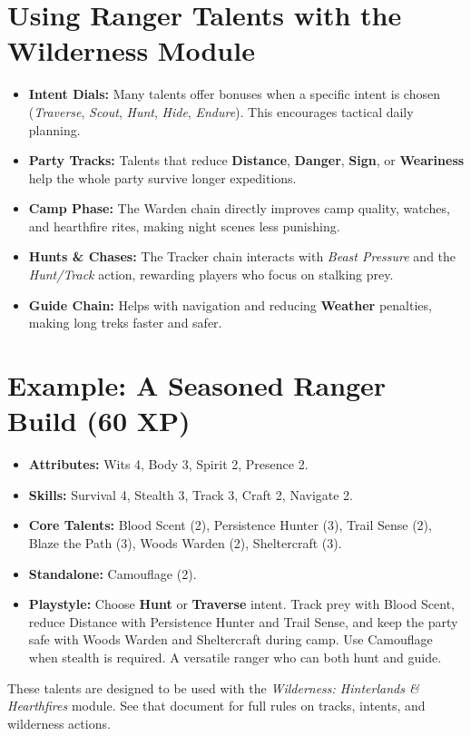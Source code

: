 \documentclass[11pt]{article}
\begin{document}
\section{Using Ranger Talents with the Wilderness Module}

\begin{itemize}
  \item \textbf{Intent Dials:} Many talents offer bonuses when a specific intent is chosen (\emph{Traverse}, \emph{Scout}, \emph{Hunt}, \emph{Hide}, \emph{Endure}). This encourages tactical daily planning.
  \item \textbf{Party Tracks:} Talents that reduce \textbf{Distance}, \textbf{Danger}, \textbf{Sign}, or \textbf{Weariness} help the whole party survive longer expeditions.
  \item \textbf{Camp Phase:} The Warden chain directly improves camp quality, watches, and hearthfire rites, making night scenes less punishing.
  \item \textbf{Hunts \& Chases:} The Tracker chain interacts with \emph{Beast Pressure} and the \emph{Hunt/Track} action, rewarding players who focus on stalking prey.
  \item \textbf{Guide Chain:} Helps with navigation and reducing \textbf{Weather} penalties, making long treks faster and safer.
\end{itemize}

\section*{Example: A Seasoned Ranger Build (60 XP)}
\begin{itemize}
  \item \textbf{Attributes:} Wits 4, Body 3, Spirit 2, Presence 2.
  \item \textbf{Skills:} Survival 4, Stealth 3, Track 3, Craft 2, Navigate 2.
  \item \textbf{Core Talents:} Blood Scent (2), Persistence Hunter (3), Trail Sense (2), Blaze the Path (3), Woods Warden (2), Sheltercraft (3).
  \item \textbf{Standalone:} Camouflage (2).
  \item \textbf{Playstyle:} Choose \textbf{Hunt} or \textbf{Traverse} intent. Track prey with Blood Scent, reduce Distance with Persistence Hunter and Trail Sense, and keep the party safe with Woods Warden and Sheltercraft during camp. Use Camouflage when stealth is required. A versatile ranger who can both hunt and guide.
\end{itemize}

\begin{center}\small These talents are designed to be used with the \textit{Wilderness: Hinterlands \& Hearthfires} module. See that document for full rules on tracks, intents, and wilderness actions.\end{center}
\end{document}
